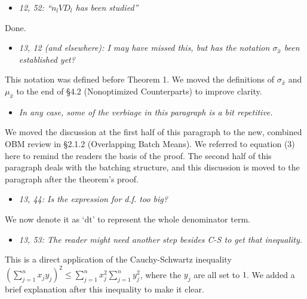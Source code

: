 \documentclass[11pt,notitlepage,onecolumn]{article}
\newcommand{\noi}{\noindent}
\begin{document}
\begin{itemize}
\item[] \textit{12, 52: ``$n_l VD_l$ has been studied''}
\end{itemize}

\noi
Done.
\medskip 



\begin{itemize}
\item[] \textit{13, 12 (and elsewhere): I may have missed this, but has the notation $\sigma_{\hat{x}}$ been established yet?}
\end{itemize}

\noi
This notation was defined before Theorem 1. 
We moved the definitions of $\sigma_{\hat{x}}$ and $\mu_{\hat{x}}$ to the end of \S 4.2 (Nonoptimized Counterparts) to improve clarity. 
\medskip 



\begin{itemize}
\item[] \textit{In any case, some of the verbiage in this paragraph is a bit repetitive.}
\end{itemize}

\noi
We moved the discussion at the first half of this paragraph to the new, combined OBM review in \S 2.1.2 (Overlapping Batch Means). 
We referred to equation (3) here to remind the readers the basis of the proof.
The second half of this paragraph deals with the batching structure, and this discussion is moved to the paragraph after the theorem's proof. 
\medskip 



\begin{itemize}
\item[] \textit{13, 44: Is the expression for d.f. too big?}
\end{itemize}

\noi
We now denote it as `dt' to represent the whole denominator term. 
\medskip 



\begin{itemize}
\item[] \textit{13, 53: The reader might need another step besides C-S to get that inequality.}
\end{itemize}

\noi
This is a direct application of the Cauchy-Schwartz inequality $\left(\sum_{j=1}^{n}x_j y_j\right)^2 \leq \sum_{j=1}^{n}x_j^2 \sum_{j=1}^{n}y_j^2$, where the $y_j$ are all set to $1$. 
We added a brief explanation after this inequality to make it clear. 
\medskip 
\end{document}
